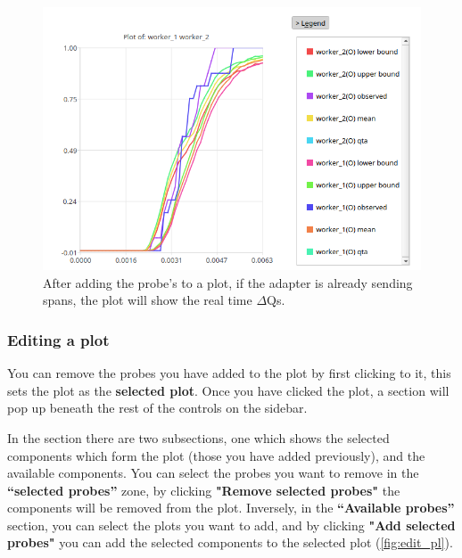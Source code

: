     \begin{figure}[H]
        \begin{center}
        \includegraphics[width = \textwidth]{img/manual/running.png}
        \end{center}
        \caption{After adding the probe's to a plot, if the adapter is already sending spans, the plot will show the real time $\Delta$Qs.}
        \label{fig:new_sel}
    \end{figure}

\subsubsection{Editing a plot}
    You can remove the probes you have added to the plot by first clicking to it, this sets the plot as the \textbf{selected plot}. Once you have clicked the plot, a section will pop up beneath the rest of the controls on the sidebar. 
        

    In the section there are two subsections, one which shows the selected components which form the plot (those you have added previously), and the available components. You can select the probes you want to remove in the \textbf{``selected probes''} zone, by clicking \textbf{"Remove selected probes"} the components will be removed from the plot. Inversely, in the \textbf{``Available probes''} section, you can select the plots you want to add, and by clicking \textbf{"Add selected probes"} you can add the selected components to the selected plot (\cref{fig:edit_pl}).

